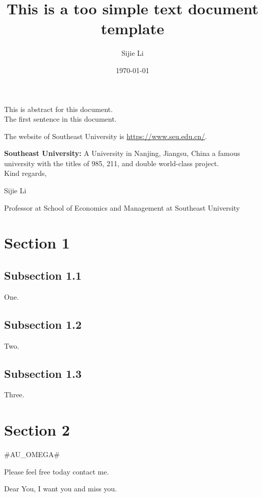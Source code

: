 \documentclass[a4paper,fleqn,12pt]{article}
\begin{document}
\title {This is a too simple text document template} %
\author{Sijie Li}	%
\date{\today}     %

\maketitle
{\abstract This is abstract for this document.}
~\\

The first sentence in this document. 

The website of Southeast University is \url{https://www.seu.edu.cn/}.

\textbf{Southeast University:} A University \textendash in Nanjing, Jiangsu, China \textendash a famous university with the titles of 985, 211, and double world-class project.
~\\

Kind regards,

Sijie Li

Professor at School of Economics and Management at Southeast University

\section*{Section 1}
\subsection*{Subsection 1.1}

One.

\subsection*{Subsection 1.2}

Two.

\subsection*{Subsection 1.3}

Three.

\section*{Section 2}

\#AU\_OMEGA\#

Please feel free today contact me.

Dear You, I want you and miss you.
\end{document}
